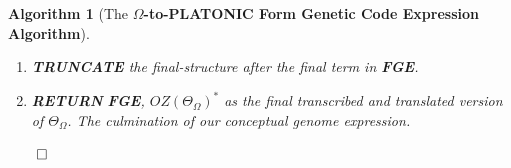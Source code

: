 \documentclass[a4paper, 18pt]{book} %
\newtheorem{alg}{Algorithm}
\newcommand{\invpi}{\rotatebox[origin=c]{180}{$\pi$}}
\begin{document}
\begin{appendices}
\begin{alg}[The \textbf{$\Omega$-to-PLATONIC Form Genetic Code Expression Algorithm}]
\begin{enumerate}
{\begin{enumerate}
{\begin{enumerate}
{\begin{enumerate}
{	\begin{equation}
	0 \leq (j = (\invpi(\psi_{pf})-i)) \leq (\invpi(\psi_{pf}) = \invpi(\psi_\Omega)) \geq \invpi(\overset{>}{OZ(\Theta_\Omega)})
	\end{equation}\\
	
	
	as depicted in example \textbf{Figure \ref{FIGEXAPLATONICFORMPFA}}, with each expression of $\omega_i^*$ attached to one of the $j$ \textbf{appendage spots} on the shape for $\boxed{\omega_i^*}$.
	}
	\item \textbf{PROCEED} to the next symbol in \textbf{IFA MSS}, $\overset{>}{OZ(\Theta_\Omega)}$\\ (loop from \textbf{Step\#2(c))}.
	\end{enumerate}
	}
\end{enumerate}
}
\end{enumerate}
}

\item \textbf{TRUNCATE} the final-structure after the final term in \textbf{FGE}.
\item \textbf{RETURN} \textbf{FGE}, $\boxed{OZ(\Theta_\Omega)}^*$ as the final transcribed and translated version of $\Theta_\Omega$. The culmination of our conceptual genome expression.
\end{enumerate}
$\qed$
\end{alg}


\begin{center}
\\
\end{center}




\end{appendices}
\end{document}
